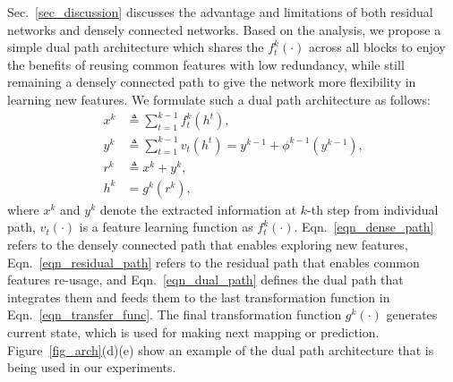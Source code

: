 \documentclass{article}
\begin{document}
Sec.~\ref{sec_discussion} discusses the advantage and limitations of both residual networks and densely connected networks. Based on the analysis, we propose a simple dual path architecture which shares the $f_t^k(\cdot)$ across all blocks to enjoy the benefits of reusing common features with low redundancy, while still remaining a densely connected path to give the network more flexibility in learning new features. We formulate such a dual path architecture as follows:
\vskip -0.15in
\begin{align} 
\label{eqn_dense_path}
x^{k} &\triangleq \sum\limits_{t=1}^{k-1} f_t^{k}(h^t) \text{,} \\
\label{eqn_residual_path}
y^{k} & \triangleq \sum\limits_{t=1}^{k-1} v_t(h^t) = y^{k-1} + \phi^{k-1}(y^{k-1}) \text{,} \\
\label{eqn_dual_path}
r^{k} &\triangleq x^{k} + y^{k} \text{,} \\
\label{eqn_transfer_func}
h^k &= g^k \left( r^{k} \right) \text{,}
\end{align} 
where $x^{k}$ and $y^{k}$ denote the extracted information at $k$-th step from individual path, $v_t(\cdot)$ is a feature learning function as $f_t^k(\cdot)$. Eqn.~\eqref{eqn_dense_path} refers to the densely connected path that enables exploring new features, Eqn.~\eqref{eqn_residual_path} refers to the residual path that enables common features re-usage, and Eqn.~\eqref{eqn_dual_path} defines the dual path that integrates them and feeds them to the last transformation function in Eqn.~\eqref{eqn_transfer_func}. The final transformation function $g^k(\cdot)$ generates current state, which is used for making next mapping or prediction. Figure~\ref{fig_arch}(d)(e) show an example of the dual path architecture that is being used in our experiments.
\end{document}
